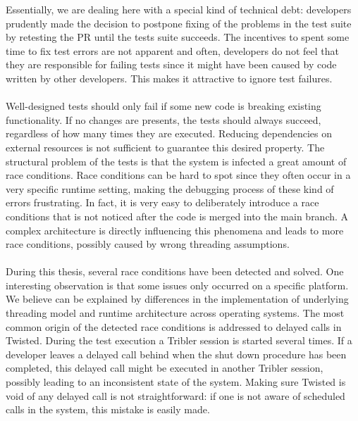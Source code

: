 Essentially, we are dealing here with a special kind of technical debt: developers prudently made the decision to postpone fixing of the problems in the test suite by retesting the PR until the tests suite succeeds. The incentives to spent some time to fix test errors are not apparent and often, developers do not feel that they are responsible for failing tests since it might have been caused by code written by other developers. This makes it attractive to ignore test failures.\\\\
Well-designed tests should only fail if some new code is breaking existing functionality. If no changes are presents, the tests should always succeed, regardless of how many times they are executed. Reducing dependencies on external resources is not sufficient to guarantee this desired property. The structural problem of the tests is that the system is infected a great amount of race conditions. Race conditions can be hard to spot since they often occur in a very specific runtime setting, making the debugging process of these kind of errors frustrating. In fact, it is very easy to deliberately introduce a race conditions that is not noticed after the code is merged into the main branch. A complex architecture is directly influencing this phenomena and leads to more race conditions, possibly caused by wrong threading assumptions.\\\\
During this thesis, several race conditions have been detected and solved. One interesting observation is that some issues only occurred on a specific platform. We believe can be explained by differences in the implementation of underlying threading model and runtime architecture across operating systems. The most common origin of the detected race conditions is addressed to delayed calls in Twisted. During the test execution a Tribler session is started several times. If a developer leaves a delayed call behind when the shut down procedure has been completed, this delayed call might be executed in another Tribler session, possibly leading to an inconsistent state of the system. Making sure Twisted is void of any delayed call is not straightforward: if one is not aware of scheduled calls in the system, this mistake is easily made.

